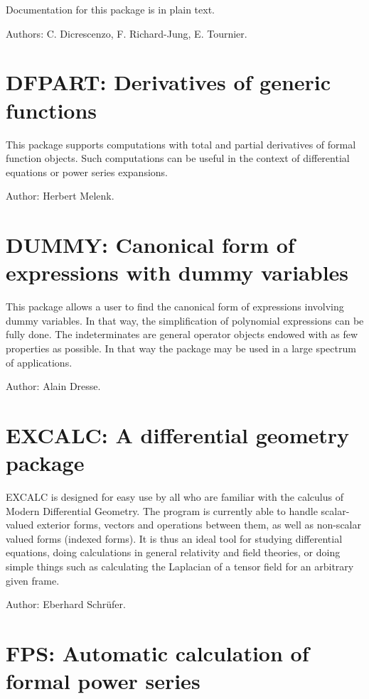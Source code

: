 Documentation for this package is in plain text.

Authors: C. Dicrescenzo, F. Richard-Jung, E. Tournier.

\section{DFPART: Derivatives of generic functions}

This package supports computations with total and partial derivatives of
formal function objects.  Such computations can be useful in the context
of differential equations or power series expansions.

Author: Herbert Melenk.

\section{DUMMY: Canonical form of expressions with dummy variables}

This package allows a user to find the canonical form of expressions
involving dummy variables. In that way, the simplification of
polynomial expressions can be fully done. The indeterminates are general
operator objects endowed with as few properties as possible. In that way
the package may be used in a large spectrum of applications.

Author: Alain Dresse.

\section{EXCALC: A differential geometry package} 

EXCALC is designed for easy use by all who are familiar with the calculus
of Modern Differential Geometry. The program is currently able to handle
scalar-valued exterior forms, vectors and operations between them, as well
as non-scalar valued forms (indexed forms). It is thus an ideal tool for
studying differential equations, doing calculations in general relativity
and field theories, or doing simple things such as calculating the
Laplacian of a tensor field for an arbitrary given frame.

Author: Eberhard Schr\"ufer.

\section{FPS: Automatic calculation of formal power series} 

